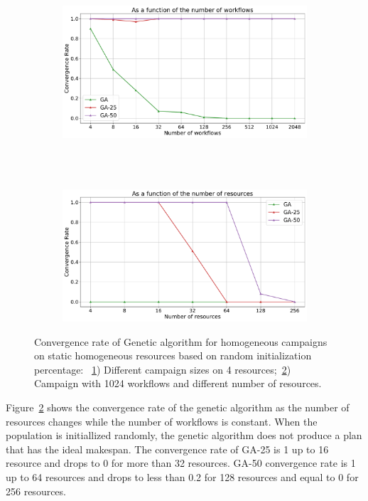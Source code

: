 \begin{figure}[ht!]
    \centering
    \begin{subfigure}[b]{0.75\textwidth}
        \includegraphics[width=.95\textwidth]{figures/campaign/StHomoCampaigns_4StHomoResourcesGAconv.pdf}
        \caption{}
        \label{fig:ga_conv1}
    \end{subfigure}\\
    ~ 
    \begin{subfigure}[b]{0.75\textwidth}
        \includegraphics[width=.95\textwidth]{figures/campaign/HomogeResources_StHomogeCampaignsGAconv.pdf}
        \caption{}
        \label{fig:ga_conv2}
    \end{subfigure}
    \caption{Convergence rate of Genetic algorithm for homogeneous campaigns on static homogeneous resources based on random initialization percentage: ~\ref{fig:ga_conv1}) Different campaign sizes on 4 resources;~\ref{fig:ga_conv2}) Campaign with 1024 workflows and different number of resources.}
    \label{fig:conv_rate}
\end{figure}

Figure~\ref{fig:ga_conv2} shows the convergence rate of the genetic algorithm as the number of resources changes while the number of workflows is constant.
When the population is initiallized randomly, the genetic algorithm does not produce a plan that has the ideal makespan.
The convergence rate of GA-25 is 1 up to 16 resource and drops to 0 for more than 32 resources.
GA-50 convergence rate is 1 up to 64 resources and drops to less than 0.2 for 128 resources and equal to 0 for 256 resources.


